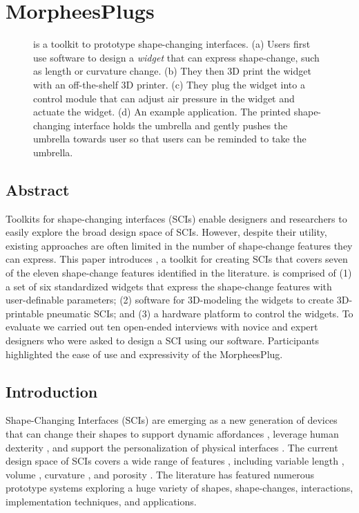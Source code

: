 \chapter{MorpheesPlugs}
  \begin{figure}[h]
    \centering
    \label{fig:teaser}

    \caption{\mp is a toolkit to prototype shape-changing interfaces. (a) Users
      first use software to design a \textit{widget} that can express
      shape-change, such as length or curvature change. (b) They then 3D print the
      widget with an off-the-shelf 3D printer. (c) They plug the widget into a
      control module that can adjust air pressure in the widget and actuate the
      widget. (d) An example application. The printed shape-changing interface
      holds the umbrella and gently pushes the umbrella towards user so that users
      can be reminded to take the umbrella.}
  \end{figure}

  \section{Abstract}
    Toolkits for shape-changing interfaces (SCIs) enable designers and researchers
    to easily explore the broad design space of SCIs. However, despite their
    utility, existing approaches are often limited in the number of shape-change
    features they can express. This paper introduces \mp, a toolkit for creating
    SCIs that covers seven of the eleven shape-change features identified in the
    literature. \mp is comprised of (1) a set of six standardized widgets that
    express the shape-change features with user-definable parameters; (2) software
    for 3D-modeling the widgets to create 3D-printable pneumatic SCIs; and (3) a
    hardware platform to control the widgets. To evaluate \mp we carried out ten
    open-ended interviews with novice and expert designers who were asked to
    design a SCI using our software. Participants highlighted the ease of use and
    expressivity of the MorpheesPlug.

  \section{Introduction}
    Shape-Changing Interfaces (SCIs) are emerging as a new generation of
    devices that can change their shapes to support dynamic affordances
    \cite{10.1145/2501988.2502032}, leverage human dexterity \cite{6926382},
    and support the personalization of physical interfaces
    \cite{10.1145/1357054.1357090}. The current design space of SCIs covers a
    wide range of features \cite{10.1145/3173574.3174193}, including variable
    length \cite{10.1145/2501988.2502032}, volume
    \cite{10.1145/1357054.1357090}, curvature \cite{Yao:2013bg}, and porosity
    \cite{10.1145/1517664.1517671}. The literature has featured numerous
    prototype systems exploring a huge variety of shapes, shape-changes,
    interactions, implementation techniques, and applications. 
    
